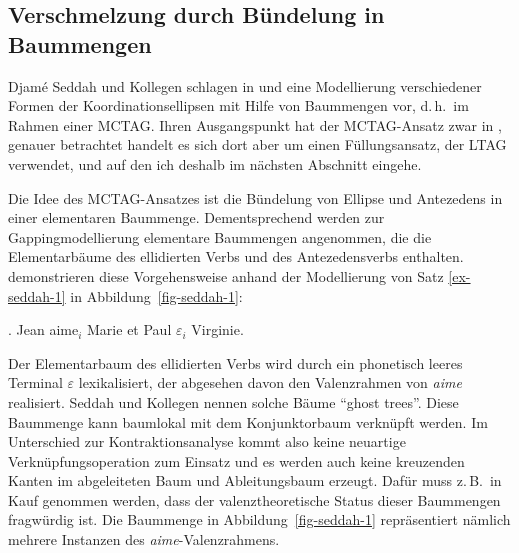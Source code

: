 \subsection{Verschmelzung durch Bündelung in Baummengen}

Djam\'e Seddah und Kollegen schlagen in \cite{Seddah:08} und \cite{Seddah:etal:10} eine Modellierung verschiedener Formen der Koordinationsellipsen mit Hilfe von Baummengen vor, d.\,h.\ im Rahmen einer MCTAG. Ihren Ausgangspunkt hat der MCTAG-Ansatz zwar in \cite{Seddah:Sagot:06}, genauer betrachtet handelt es sich dort aber um einen Füllungsansatz, der LTAG verwendet, und auf den ich deshalb im nächsten Abschnitt eingehe.

Die Idee des MCTAG-Ansatzes ist die Bündelung von Ellipse und Antezedens in einer elementaren Baummenge. Dementsprechend werden zur Gappingmodellierung elementare Baummengen angenommen, die die Elementarbäume des ellidierten Verbs und des Antezedensverbs enthalten. \cite{Seddah:etal:10} demonstrieren diese Vorgehensweise anhand der Modellierung von Satz \ref{ex-seddah-1} in Abbildung~\ref{fig-seddah-1}:

\ex. \label{ex-seddah-1} Jean aime$_i$ Marie et Paul $\varepsilon_i$ Virginie. \hfill \citep[(1)]{Seddah:etal:10}

Der Elementarbaum des ellidierten Verbs wird durch ein phonetisch leeres Terminal $\varepsilon$ lexikalisiert, der abgesehen davon den Valenzrahmen von {\it aime} realisiert. Seddah und Kollegen nennen solche Bäume "`ghost trees"'. Diese Baummenge kann baumlokal mit dem Konjunktorbaum verknüpft werden. Im Unterschied zur Kontraktionsanalyse kommt also keine neuartige Verknüpfungsoperation zum Einsatz und es werden auch keine kreuzenden Kanten im abgeleiteten Baum und Ableitungsbaum erzeugt. Dafür muss z.\,B.\ in Kauf genommen werden, dass der valenztheoretische Status dieser Baummengen fragwürdig ist. Die Baummenge in Abbildung~\ref{fig-seddah-1} repräsentiert nämlich mehrere Instanzen des {\it aime}-Valenzrahmens. 

